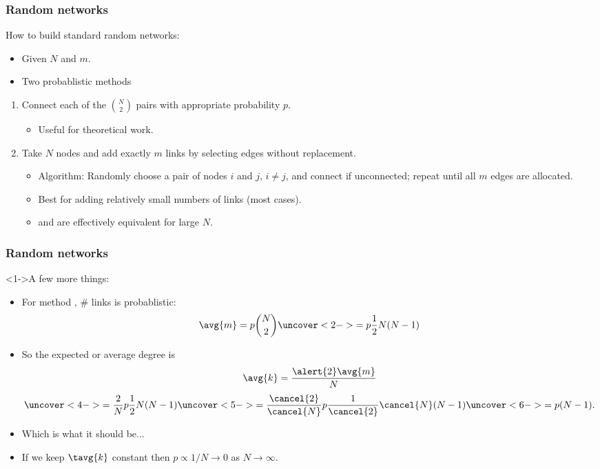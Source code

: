 \begin{frame}[label=]
  \frametitle{Random networks}

  \begin{block}{How to build standard random networks:}
    \begin{itemize}
    \item<1-> Given $N$ and $m$.
    \item<2-> Two probablistic methods 
    \end{itemize}
    \begin{enumerate}
    \item<4-> Connect each of the $\binom{N}{2}$ pairs 
      with appropriate probability $p$.
        \begin{itemize}
        \item<6-> \alert{Useful for theoretical work.}
        \end{itemize}
      \item<5-> Take $N$ nodes and add exactly $m$ links
        by selecting edges without replacement.
        \begin{itemize}
        \item<7-> \alert{Algorithm:} Randomly choose a pair of nodes $i$ and $j$, $i \ne j$,
          and connect if unconnected; repeat until all $m$ edges
          are allocated.
        \item<8-> Best for adding relatively small numbers of links (most cases).
        \item<9->  and  are effectively equivalent
          for large $N$.
        \end{itemize}
    \end{enumerate}
  \end{block}

\end{frame}

\begin{frame}
  \frametitle{Random networks}

  \begin{block}<1->{A few more things:}
  \begin{itemize}
  \item<1->
    For method , \# links is
    probablistic:
    $$
    \avg{m} = p \binom{N}{2} \uncover<2->{= p\frac{1}{2}N(N-1)}
    $$
  \item<3->
    So the expected or \alert{average degree} is 
    $$
    \avg{k} = \frac{\alert{2} \avg{m}}{N} 
    $$
    $$
    \uncover<4->{
      = \frac{2}{N} p\frac{1}{2}N(N-1)
    }
    \uncover<5->{
      = \frac{\cancel{2}}{\cancel{N}} p\frac{1}{\cancel{2}}\cancel{N}(N-1)
      }
    \uncover<6->{
      = p(N-1).
    }
    $$
  \item<7-> Which is what it should be...
  \item<8-> 
    If we keep $\tavg{k}$ constant then
    $p \propto 1/N \rightarrow 0$ as $N \rightarrow \infty$.
  \end{itemize}
    
  \end{block}
  
\end{frame}


